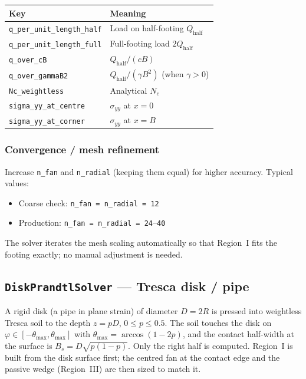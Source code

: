 \documentclass[11pt,a4paper]{article}
\newcommand{\Nc}{N_c}
\begin{document}
\begin{center}
\begin{tabular}{ll}
\toprule
Key & Meaning \\
\midrule
\texttt{q\_per\_unit\_length\_half} & Load on half-footing $Q_\text{half}$ \\
\texttt{q\_per\_unit\_length\_full} & Full-footing load $2Q_\text{half}$ \\
\texttt{q\_over\_cB}               & $Q_\text{half}/(cB)$ \\
\texttt{q\_over\_gammaB2}          & $Q_\text{half}/(\gamma B^2)$ (when $\gamma>0$) \\
\texttt{Nc\_weightless}            & Analytical $\Nc$ \\
\texttt{sigma\_yy\_at\_centre}     & $\sigma_{yy}$ at $x=0$ \\
\texttt{sigma\_yy\_at\_corner}     & $\sigma_{yy}$ at $x=B$ \\
\bottomrule
\end{tabular}
\end{center}

\subsubsection*{Convergence / mesh refinement}

Increase \texttt{n\_fan} and \texttt{n\_radial} (keeping them equal) for
higher accuracy.  Typical values:
\begin{itemize}
  \item Coarse check: \texttt{n\_fan = n\_radial = 12}
  \item Production: \texttt{n\_fan = n\_radial = 24}–\texttt{40}
\end{itemize}
The solver iterates the mesh scaling automatically so that Region~I fits
the footing exactly; no manual adjustment is needed.

\subsection{\texttt{DiskPrandtlSolver} — Tresca disk / pipe}
\label{sec:tresca_disk}

A rigid disk (a pipe in plane strain) of diameter $D = 2R$ is pressed
into weightless Tresca soil to the depth $z = pD$, $0 \le p \le 0.5$.
The soil touches the disk on $\varphi \in [-\theta_{\max}, \theta_{\max}]$
with $\theta_{\max} = \arccos(1-2p)$, and the contact half-width at the
surface is $B_s = D\sqrt{p(1-p)}$.  Only the right half is computed.
Region~I is built from the disk surface first; the centred fan at the
contact edge and the passive wedge (Region~III) are then sized to match
it.
\end{document}
